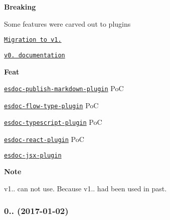 \begin{DoxyItemize}
\item {\bfseries Breaking}
\begin{DoxyItemize}
\item Some features were carved out to plugins
\begin{DoxyItemize}
\item \href{https://esdoc.org/manual/migration.html}{\tt Migration to v1.}
\item \href{https://esdoc.org/v0.5/index.html}{\tt v0. documentation}
\end{DoxyItemize}
\end{DoxyItemize}
\item {\bfseries Feat}
\begin{DoxyItemize}
\item \href{https://github.com/esdoc/esdoc-plugins/tree/master/esdoc-publish-markdown-plugin}{\tt esdoc-\/publish-\/markdown-\/plugin} PoC
\item \href{https://github.com/esdoc/esdoc-plugins/tree/master/esdoc-flow-type-plugin}{\tt esdoc-\/flow-\/type-\/plugin} PoC
\item \href{https://github.com/esdoc/esdoc-plugins/tree/master/esdoc-typescript-plugin}{\tt esdoc-\/typescript-\/plugin} PoC
\item \href{https://github.com/esdoc/esdoc-plugins/tree/master/esdoc-react-plugin}{\tt esdoc-\/react-\/plugin} PoC
\item \href{https://github.com/esdoc/esdoc-plugins/tree/master/esdoc-jsx-plugin}{\tt esdoc-\/jsx-\/plugin}
\end{DoxyItemize}
\item {\bfseries Note}
\begin{DoxyItemize}
\item {\ttfamily v1..} can not use. Because {\ttfamily v1..} had been used in past.
\end{DoxyItemize}
\end{DoxyItemize}

\subsubsection*{0.. (2017-\/01-\/02)}


